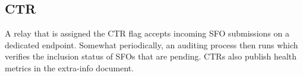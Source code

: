 %

%
%

\subsection{CTR} \label{sec:design:ctr}
A relay that is assigned the CTR flag accepts incoming SFO submissions on a
dedicated endpoint.  Somewhat periodically, an auditing process then runs which
verifies the inclusion status of SFOs that are pending.  CTRs also
publish health metrics in the extra-info document.

